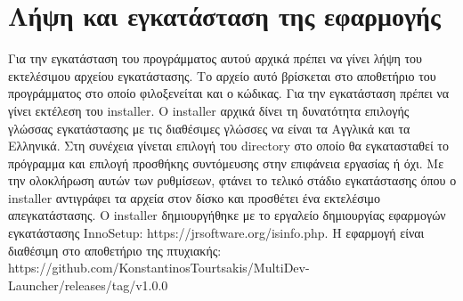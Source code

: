 







\section{Λήψη και εγκατάσταση της εφαρμογής}
Για την εγκατάσταση του προγράμματος αυτού αρχικά πρέπει να γίνει λήψη του εκτελέσιμου
αρχείου εγκατάστασης. Το αρχείο αυτό βρίσκεται στο αποθετήριο του προγράμματος στο οποίο
φιλοξενείται και ο κώδικας. Για την εγκατάσταση πρέπει να γίνει εκτέλεση του installer. Ο
installer αρχικά δίνει τη δυνατότητα επιλογής γλώσσας εγκατάστασης με τις διαθέσιμες γλώσσες
να είναι τα Αγγλικά και τα Ελληνικά. Στη συνέχεια γίνεται επιλογή του directory στο οποίο θα
εγκατασταθεί το πρόγραμμα και επιλογή προσθήκης συντόμευσης στην επιφάνεια εργασίας ή όχι. Με
την ολοκλήρωση αυτών των ρυθμίσεων, φτάνει το τελικό στάδιο εγκατάστασης όπου ο installer 
αντιγράφει τα αρχεία στον δίσκο και προσθέτει ένα εκτελέσιμο απεγκατάστασης. Ο installer
δημιουργήθηκε με το εργαλείο δημιουργίας εφαρμογών εγκατάστασης InnoSetup:
https://jrsoftware.org/isinfo.php. Η εφαρμογή είναι διαθέσιμη στο αποθετήριο της πτυχιακής: 
https://github.com/KonstantinosTourtsakis/MultiDev-Launcher/releases/tag/v1.0.0